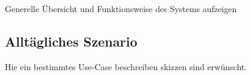 Generelle Übersicht und Funktionsweise des Systems aufzeigen

\subsection{Alltägliches Szenario}
Hie ein bestimmtes Use-Case beschreiben skizzen sind erwünscht.